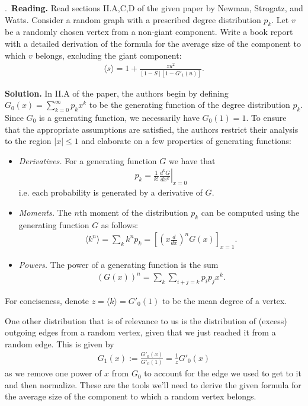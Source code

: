 \documentclass{letter}
\newcounter{problem}
\newcommand{\Problem}[2]{%
	\stepcounter{problem}%
	\leftskip=0pt%
	\theproblem.~\textbf{{#1.}} #2 \par%
}
\newcommand{\Solution}[1]{%
	\textbf{Solution.} #1 \par%
}
\begin{document}
    \Problem{Reading}{Read sections II.A,C,D of the given paper by Newman, Strogatz, and Watts. Consider a random graph with a prescribed degree distribution $p_k$. Let $v$ be a randomly chosen vertex from a non-giant component. Write a book report with a detailed derivation of the formula for the average size of the component to which $v$ belongs, excluding the giant component: \begin{align*}
        \langle s \rangle = 1 + \frac{zu^2}{[1-S][1-G'_1(u)]}.
    \end{align*}}
    \Solution{In II.A of the paper, the authors begin by defining $G_0(x) = \sum_{k=0}^\infty p_kx^k$ to be the generating function of the degree distribution $p_k$. Since $G_0$ is a generating function, we necessarily have $G_0(1) = 1$. To ensure that the appropriate assumptions are satisfied, the authors restrict their analysis to the region $|x| \leq 1$ and elaborate on a few properties of generating functions: \begin{itemize}
        \item \emph{Derivatives.} For a generating function $G$ we have that \begin{align*}
            p_k = \frac{1}{k!}\left.\frac{d^kG}{dx^k}\right|_{x=0}
        \end{align*} i.e. each probability is generated by a derivative of $G$.
        \item \emph{Moments.} The $n$th moment of the distribution $p_k$ can be computed using the generating function $G$ as follows: \begin{align*}
            \langle k^n \rangle = \sum_k k^np_k = \left[\left(x\frac{d}{dx}\right)^nG(x)\right]_{x=1}.
        \end{align*}
        \item \emph{Powers.} The power of a generating function is the sum \begin{align*}
            (G(x))^n = \sum_k \sum_{i + j = k} p_ip_jx^k.
        \end{align*}
    \end{itemize} For conciseness, denote $z = \langle k \rangle = G'_0(1)$ to be the mean degree of a vertex.
    
    One other distribution that is of relevance to us is the distribution of (excess) outgoing edges from a random vertex, given that we just reached it from a random edge. This is given by \begin{align*}
        G_1(x) := \frac{G'_0(x)}{G'_0(1)} = \frac{1}{z}G'_0(x)
    \end{align*} as we remove one power of $x$ from $G_0$ to account for the edge we used to get to it and then normalize. These are the tools we'll need to derive the given formula for the average size of the component to which a random vertex belongs.
    
}
\end{document}
